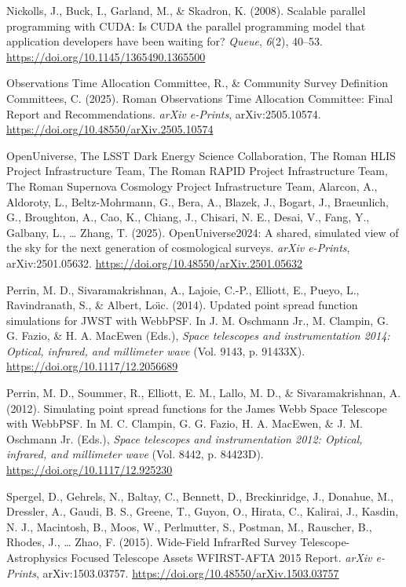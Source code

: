 \documentclass[10pt,a4paper,onecolumn]{article}
\newlength{\cslhangindent}
\newenvironment{CSLReferences}[2] %
 {\begin{list}{}{%
  \setlength{\itemindent}{0pt}
  \setlength{\leftmargin}{0pt}
  \setlength{\parsep}{0pt}
  \ifodd #1
   \setlength{\leftmargin}{\cslhangindent}
   \setlength{\itemindent}{-1\cslhangindent}
  \fi
  \setlength{\itemsep}{#2\baselineskip}}}
 {\end{list}}
\begin{document}
\begin{CSLReferences}{1}{0.5}
Nickolls, J., Buck, I., Garland, M., \& Skadron, K. (2008). Scalable
parallel programming with CUDA: Is CUDA the parallel programming model
that application developers have been waiting for? \emph{Queue},
\emph{6}(2), 40--53. \url{https://doi.org/10.1145/1365490.1365500}

Observations Time Allocation Committee, R., \& Community Survey
Definition Committees, C. (2025). {Roman Observations Time Allocation
Committee: Final Report and Recommendations}. \emph{arXiv e-Prints},
arXiv:2505.10574. \url{https://doi.org/10.48550/arXiv.2505.10574}

OpenUniverse, The LSST Dark Energy Science Collaboration, The Roman HLIS
Project Infrastructure Team, The Roman RAPID Project Infrastructure
Team, The Roman Supernova Cosmology Project Infrastructure Team,
Alarcon, A., Aldoroty, L., Beltz-Mohrmann, G., Bera, A., Blazek, J.,
Bogart, J., Braeunlich, G., Broughton, A., Cao, K., Chiang, J., Chisari,
N. E., Desai, V., Fang, Y., Galbany, L., \ldots{} Zhang, T. (2025).
{OpenUniverse2024: A shared, simulated view of the sky for the next
generation of cosmological surveys}. \emph{arXiv e-Prints},
arXiv:2501.05632. \url{https://doi.org/10.48550/arXiv.2501.05632}

Perrin, M. D., Sivaramakrishnan, A., Lajoie, C.-P., Elliott, E., Pueyo,
L., Ravindranath, S., \& Albert, Loı̈c. (2014). {Updated point spread
function simulations for JWST with WebbPSF}. In J. M. Oschmann Jr., M.
Clampin, G. G. Fazio, \& H. A. MacEwen (Eds.), \emph{Space telescopes
and instrumentation 2014: Optical, infrared, and millimeter wave} (Vol.
9143, p. 91433X). \url{https://doi.org/10.1117/12.2056689}

Perrin, M. D., Soummer, R., Elliott, E. M., Lallo, M. D., \&
Sivaramakrishnan, A. (2012). {Simulating point spread functions for the
James Webb Space Telescope with WebbPSF}. In M. C. Clampin, G. G. Fazio,
H. A. MacEwen, \& J. M. Oschmann Jr. (Eds.), \emph{Space telescopes and
instrumentation 2012: Optical, infrared, and millimeter wave} (Vol.
8442, p. 84423D). \url{https://doi.org/10.1117/12.925230}

Spergel, D., Gehrels, N., Baltay, C., Bennett, D., Breckinridge, J.,
Donahue, M., Dressler, A., Gaudi, B. S., Greene, T., Guyon, O., Hirata,
C., Kalirai, J., Kasdin, N. J., Macintosh, B., Moos, W., Perlmutter, S.,
Postman, M., Rauscher, B., Rhodes, J., \ldots{} Zhao, F. (2015).
{Wide-Field InfrarRed Survey Telescope-Astrophysics Focused Telescope
Assets WFIRST-AFTA 2015 Report}. \emph{arXiv e-Prints},
arXiv:1503.03757. \url{https://doi.org/10.48550/arXiv.1503.03757}


\end{CSLReferences}
\end{document}

